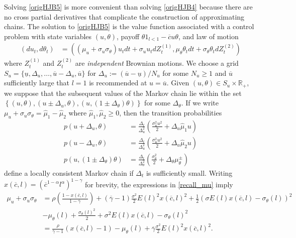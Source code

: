 \documentclass[11pt]{article}
\theoremstyle{plain}
\begin{document}
Solving \eqref{origHJB5} is more convenient than solving \eqref{origHJB4} because there are no cross partial derivatives that complicate the construction of approximating chains. The solution to \eqref{origHJB5} is the value function associated with a control problem with state variables $(u,\theta)$, payoff $\theta 1_{l<1} - \overline{c}u\theta$, and law of motion 
\begin{equation}
\begin{aligned}
(du_t, d\theta_t) & = {\left((\mu_u + \sigma_u \sigma_{\theta})u_tdt + \sigma_uu_tdZ_t^{(1)}, \mu_{\theta}\theta_tdt + \sigma_{\theta}\theta_tdZ_t^{(2)}\right)}
\end{aligned}
\label{newLAW}
\end{equation}
where $Z_t^{(1)}$ and $Z_t^{(2)}$ are \textit{independent} Brownian motions. We choose a grid $S_u = \{\underline{u}, \Delta_u, \dots, \overline{u} - \Delta_u, \overline{u}\}$ for $\Delta_u := (\overline{u} - \underline{u})/N_u$ for some $N_u \geq 1$ and $\overline{u}$ sufficiently large that $l=1$ is recommended at $u = \overline{u}$. Given $(u,\theta) \in S_u \times \mathbb{R}_+$, we suppose that the subsequent values of the Markov chain lie within the set ${\left\{(u, \theta), (u \pm \Delta_u, \theta), (u, (1 \pm \Delta_{\theta})\theta) \right\}}$ for some $\Delta_{\theta}$. If we write $\mu_u + \sigma_u\sigma_{\theta} = \hat{\mu}_1 - \hat{\mu}_2$ where $\hat{\mu}_1, \hat{\mu}_2 \geq 0$, then the transition probabilities
\begin{equation}
\begin{aligned}
p(u+\Delta_u,\theta) & = \frac{\Delta_t}{\Delta_u^2}{\left(\frac{\sigma_u^2u^2}{2} + \Delta_u\hat{\mu}_1u\right)}
\\ p(u-\Delta_u,\theta) & = \frac{\Delta_t}{\Delta_u^2}{\left(\frac{\sigma_u^2u^2}{2} + \Delta_u\hat{\mu}_2u\right)}
\\ p(u, (1 \pm \Delta_{\theta})\theta) & = \frac{\Delta_t}{\Delta_{\theta}^2}{\left(\frac{\sigma_{\theta}^2}{2} + \Delta_{\theta}\mu_{\theta}^{\pm}\right)} 
\end{aligned} 
\label{u_prob2}
\end{equation}
define a locally consistent Markov chain if $\Delta_t$ is sufficiently small. Writing $x(\overline{c},l) = (\overline{c}^{1-\alpha}l^{\alpha})^{1-\gamma}$ for brevity, the expressions in \eqref{recall_mu} imply
\begin{align*}
\mu_u + \sigma_u\sigma_{\theta} & = \rho {\left(\frac{1 - x(\overline{c},l)}{1-\overline{\gamma}}\right)} + (\overline{\gamma}-1)\frac{\sigma^2}{2} E(l)^2x(\overline{c},l)^2 + \frac{1}{2}(\sigma E(l)x(\overline{c},l) - \sigma_{\theta}(l))^2
\\ & - \mu_{\theta}(l) + \frac{\sigma_{\theta}(l)^2}{2} + \sigma^2E(l)x(\overline{c},l) - \sigma_{\theta}(l)^2
\\ & = \frac{\rho}{\overline{\gamma}-1}(x(\overline{c},l)-1) - \mu_{\theta}(l)  + \overline{\gamma}\frac{\sigma^2}{2} E(l)^2x(\overline{c},l)^2.
\end{align*} 
\end{document}
